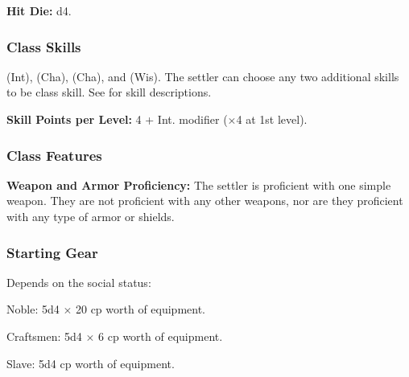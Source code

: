 
\textbf{Hit Die:} d4.

\subsubsection{Class Skills}
 (Int),  (Cha),  (Cha), and  (Wis). The settler can choose any two additional skills to be class skill. See  for skill descriptions.

\textbf{Skill Points per Level:} 4 + Int. modifier ($\times$4 at 1st level).

\subsubsection{Class Features}
\textbf{Weapon and Armor Proficiency:} The settler is proficient with one simple weapon. They are not proficient with any other weapons, nor are they proficient with any type of armor or shields.


\subsubsection{Starting Gear}
Depends on the social status:
\begin{itemize*}
\item Noble: 5d4 $\times$ 20 cp worth of equipment.
\item Craftsmen: 5d4 $\times$ 6 cp worth of equipment.
\item Slave: 5d4 cp worth of equipment.
\end{itemize*}